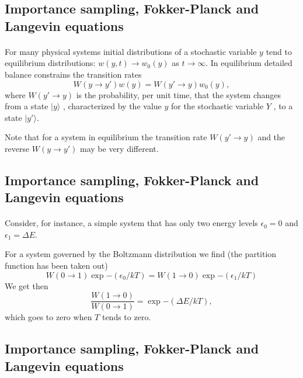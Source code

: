 \documentclass[%
twoside,                 %
final,                   %
10pt]{article}
\begin{document}
\subsection*{Importance sampling, Fokker-Planck and Langevin equations}

\paragraph{}
     For many physical systems initial distributions of a stochastic 
variable $y$ tend to equilibrium distributions: $w(y, t)\rightarrow w_0(y)$ 
as $t\rightarrow\infty$. In
equilibrium detailed balance constrains the transition rates
\[
     W(y\rightarrow y')w(y ) = W(y'\rightarrow y)w_0 (y),
\]
where $W(y'\rightarrow y)$ 
is the probability, per unit time, that the system changes
from a state $|y\rangle$ , characterized by the value $y$ 
for the stochastic variable $Y$ , to a state $|y'\rangle$.

Note that for a system in equilibrium the transition rate 
$W(y'\rightarrow y)$ and
the reverse $W(y\rightarrow y')$ may be very different.




\subsection*{Importance sampling, Fokker-Planck and Langevin equations}

\paragraph{}
Consider, for instance, a simple
system that has only two energy levels $\epsilon_0 = 0$ and 
$\epsilon_1 = \Delta E$. 

For a system governed by the Boltzmann distribution we find (the partition function has been taken out)
\[
     W(0\rightarrow 1)\exp{-(\epsilon_0/kT)} = W(1\rightarrow 0)\exp{-(\epsilon_1/kT)}
\]
We get then
\[
     \frac{W(1\rightarrow 0)}{W(0 \rightarrow 1)}=\exp{-(\Delta E/kT)},
\]
which goes to zero when $T$ tends to zero.




\subsection*{Importance sampling, Fokker-Planck and Langevin equations}
\end{document}
